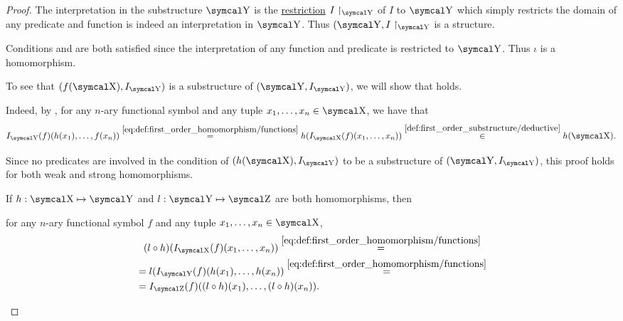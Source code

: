 \begin{proof}
   The interpretation in the substructure \( \CY \) is the \hyperref[def:function/extension]{restriction} \( I\restriction_{\CY} \) of \( I \) to \( \CY \) which simply restricts the domain of any predicate and function is indeed an interpretation in \( \CY \). Thus \( (\CY, I\restriction_{\CY} \) is a structure.

  Conditions  and  are both satisfied since the interpretation of any function and predicate is restricted to \( \CY \). Thus \( \iota \) is a homomorphism.

   To see that \( (f(\CX), I_{\CY}) \) is a substructure of \( (\CY, I_{\CY}) \), we will show that  holds.

  Indeed, by , for any \( n \)-ary functional symbol and any tuple \( {x_1, \ldots, x_n \in \CX} \), we have that
  \begin{equation*}
    I_{\CY}(f)(h(x_1), \ldots, f(x_n))
    \overset {\eqref{eq:def:first_order_homomorphism/functions}} =
    h(I_{\CX}(f)(x_1, \ldots, x_n))
    \overset {\ref{def:first_order_substructure/deductive}} \in
    h(\CX).
  \end{equation*}

  Since no predicates are involved in the condition of \( (h(\CX), I_{\CY}) \) to be a substructure of \( (\CY, I_{\CY}) \), this proof holds for both weak and strong homomorphisms.

   If \( h: \CX \mapsto \CY \) and \( l: \CY \mapsto \CZ \) are both homomorphisms, then
  \begin{RefList}
     for any \( n \)-ary functional symbol \( f \) and any tuple \( x_1, \ldots, x_n \in \CX \),
    \begin{align*}
      &{}\phantom{=}{}
      (l \circ h)(I_{\CX}(f)(x_1, \ldots, x_n))
      \overset {\eqref{eq:def:first_order_homomorphism/functions}} = \\ &=
      l(I_{\CY}(f)(h(x_1), \ldots, h(x_n))
      \overset {\eqref{eq:def:first_order_homomorphism/functions}} = \\ &=
      I_{\CZ}(f)((l \circ h)(x_1), \ldots, (l \circ h)(x_n)).
    \end{align*}


\end{RefList}
\end{proof}

